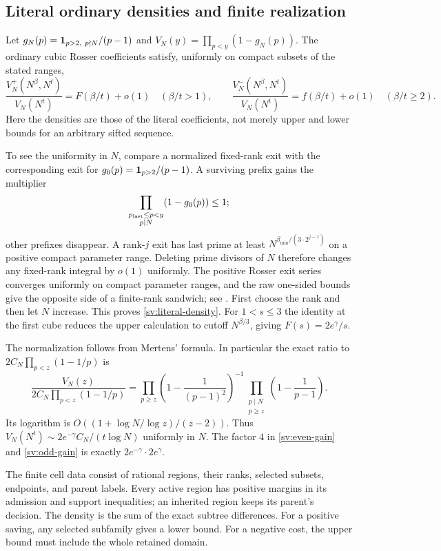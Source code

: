 \subsection{Literal ordinary densities and finite realization}

Let $g_N(p)=\mathbf 1_{p>2,\ p\nmid N}/(p-1)$ and
$V_N(y)=\prod_{p<y}(1-g_N(p))$.  The ordinary cubic Rosser
coefficients satisfy, uniformly on compact subsets of the stated
ranges,
\begin{equation}\label{sv:literal-density}
 \frac{V_N^+(N^\beta,N^t)}{V_N(N^t)}=F(\beta/t)+o(1)
       \quad(\beta/t>1),\qquad
 \frac{V_N^-(N^\beta,N^t)}{V_N(N^t)}=f(\beta/t)+o(1)
       \quad(\beta/t\ge2).
\end{equation}
Here the densities are those of the literal coefficients, not merely
upper and lower bounds for an arbitrary sifted sequence.

To see the uniformity in $N$, compare a normalized fixed-rank exit
with the corresponding exit for $g_0(p)=\mathbf 1_{p>2}/(p-1)$.
A surviving prefix gains the multiplier
\[
 \prod_{\substack{p_{\rm last}\le p<y\\p\mid N}}(1-g_0(p))\le1;
\]
other prefixes disappear.  A rank-$j$ exit has last prime at least
$N^{\beta_{\min}/(3\cdot2^{j-1})}$ on a positive compact parameter
range.  Deleting prime divisors of $N$ therefore changes any
fixed-rank integral by $o(1)$ uniformly.  The positive Rosser exit
series converges uniformly on compact parameter ranges, and the
raw one-sided bounds give the opposite side of a finite-rank
sandwich; see \cite[Proposition~11.8 and Lemma~14.7]{Suzuki}.
First choose the rank and then let $N$ increase.  This proves
\eqref{sv:literal-density}.  For $1<s\le3$ the identity at the first
cube reduces the upper calculation to cutoff $N^{\beta/3}$, giving
$F(s)=2e^\gamma/s$.

The normalization follows from Mertens' formula.  In particular the
exact ratio to $2C_N\prod_{p<z}(1-1/p)$ is
\begin{equation}\label{sv:euler-ratio}
 \frac{V_N(z)}{2C_N\prod_{p<z}(1-1/p)}
 =\prod_{p\ge z}\left(1-\frac1{(p-1)^2}\right)^{-1}
  \prod_{\substack{p\mid N\\p\ge z}}\left(1-\frac1{p-1}\right).
\end{equation}
Its logarithm is $O((1+\log N/\log z)/(z-2))$.
Thus $V_N(N^t)\sim2e^{-\gamma}C_N/(t\log N)$ uniformly in $N$.
The factor $4$ in \eqref{sv:even-gain} and \eqref{sv:odd-gain}
is exactly $2e^{-\gamma}\cdot2e^\gamma$.

The finite cell data consist of rational regions, their ranks,
selected subsets, endpoints, and parent labels. Every active region
has positive margins in its admission and support inequalities;
an inherited region keeps its parent's decision. The density is
the sum of the exact subtree differences. For a positive saving,
any selected subfamily gives a lower bound. For a negative cost,
the upper bound must include the whole retained domain.

